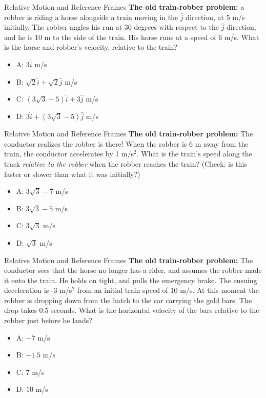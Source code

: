 \documentclass{beamer}
\begin{document}
\begin{frame}{Relative Motion and Reference Frames}
\small 
\textbf{The old train-robber problem:} a robber is riding a horse alongside a train moving in the $\hat{j}$ direction, at 5 m/s initially.  The robber angles his run at 30 degrees with respect to the $\hat{j}$ direction, and he is 10 m to the side of the train.  His horse runs at a speed of 6 m/s.  What is the horse and robber's velocity, relative to the train?\\
\begin{itemize}
\item A: $3\hat{i}$ m/s
\item B: $\sqrt{2}\hat{i} + \sqrt{2}\hat{j}$ m/s
\item C: $(3\sqrt{3}-5)\hat{i} + 3\hat{j}$  m/s
\item D: $3\hat{i} + (3\sqrt{3}-5)\hat{j}$  m/s
\end{itemize}
\end{frame}

\begin{frame}{Relative Motion and Reference Frames}
\small 
\textbf{The old train-robber problem:} The conductor realizes the robber is there!  When the robber is 6 m away from the train, the conductor accelerates by 1 m/s$^2$.  What is the train's speed along the track \textit{relative to the robber} when the robber reaches the train? (Check: is this faster or slower than what it was initially?)\\
\begin{itemize}
\item A: $3\sqrt{3}-7$ m/s
\item B: $3\sqrt{3}-5$ m/s
\item C: $3\sqrt{3}$  m/s
\item D: $\sqrt{3}$  m/s
\end{itemize}
\end{frame}

\begin{frame}{Relative Motion and Reference Frames}
\small 
\textbf{The old train-robber problem:} The conductor sees that the horse no longer has a rider, and assumes the robber made it onto the train.  He holds on tight, and pulls the emergency brake.  The ensuing deceleration is -3 m/s$^2$ from an initial train speed of 10 m/s.  At this moment the robber is dropping down from the hatch to the car carrying the gold bars.  The drop takes 0.5 seconds.  What is the horizontal velocity of the bars relative to the robber just before he lands?\\
\begin{itemize}
\item A: $-7$ m/s
\item B: $-1.5$ m/s
\item C: $7$  m/s
\item D: $10$  m/s
\end{itemize}
\end{frame}
\end{document}
